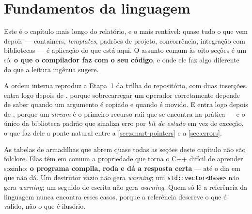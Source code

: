 
\section{Fundamentos da linguagem}
\label{sec:fundamentos}

Este é o capítulo mais longo do relatório, e o mais rentável: quase tudo o que
vem depois --- containers, \emph{templates}, padrões de projeto, concorrência,
integração com bibliotecas --- é aplicação do que está aqui. O assunto comum às
oito seções é um só: \textbf{o que o compilador faz com o seu código}, e onde
ele faz algo diferente do que a leitura ingênua sugere.

A ordem interna reproduz a Etapa~1 da trilha do repositório, com duas
inserções.  entra logo depois de ,
porque sobrecarregar um operador corretamente depende de saber quando um
argumento é copiado e quando é movido. E  entra logo depois de
, porque um \emph{stream} é o primeiro recurso
\gls{raii} que se encontra na prática --- e o único da biblioteca padrão que
sinaliza erro por \emph{bit de estado} em vez de exceção, o que faz dele a
ponte natural entre a \cref{sec:smart-pointers} e a \cref{sec:errors}.

\begin{porque}
As tabelas de armadilhas que abrem quase todas as seções deste capítulo não são
folclore. Elas têm em comum a propriedade que torna o C++ difícil de aprender
sozinho: \textbf{o programa compila, roda e dá a resposta certa} --- até o dia
em que não dá. Um destrutor vazio não gera \emph{warning}; um
\texttt{std::vector<Base>} não gera \emph{warning}; um 
seguido de escrita não gera \emph{warning}. Quem só lê a referência da
linguagem nunca encontra esses casos, porque a referência descreve o que é
válido, não o que é ilusório.
\end{porque}

